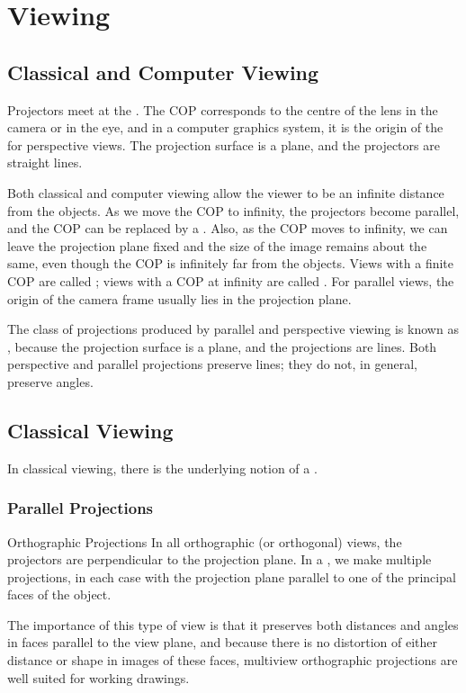 \documentclass[../COS3712_Notes.tex]{subfiles}
\begin{document}
  \setcounter{chapter}{3}
  \chapter{Viewing}
    \section{Classical and Computer Viewing}
      Projectors meet at the .
      The COP corresponds to the centre of the lens in the camera or in the eye,
      and in a computer graphics system, it is the origin of the 
      for perspective views.
      The projection surface is a plane, and the projectors are straight lines.

      Both classical and computer viewing allow the viewer to be an infinite distance
      from the objects.
      As we move the COP to infinity, the projectors become parallel, and the COP can be
      replaced by a .
      Also, as the COP moves to infinity, we can leave the projection plane fixed
      and the size of the image remains about the same, even though the COP is infinitely
      far from the objects.
      Views with a finite COP are called ;
      views with a COP at infinity are called .
      For parallel views, the origin of the camera frame usually lies in the projection plane.

      The class of projections produced by parallel and perspective viewing is known as
      , because the projection surface is a plane,
      and the projections are lines.
      Both perspective and parallel projections preserve lines;
      they do not, in general, preserve angles.

    \section{Classical Viewing}
      In classical viewing, there is the underlying notion of a .

      \subsection{Parallel Projections}
        \begin{definition}{Orthographic Projections}
          In all orthographic (or orthogonal) views, the projectors are perpendicular
          to the projection plane.
          In a , we make multiple projections,
          in each case with the projection plane parallel to one of the principal faces
          of the object.

          The importance of this type of view is that it preserves both distances and angles
          in faces parallel to the view plane,
          and because there is no distortion of either distance or shape in images of these faces,
          multiview orthographic projections are well suited for working drawings.
        \end{definition}
\end{document}
